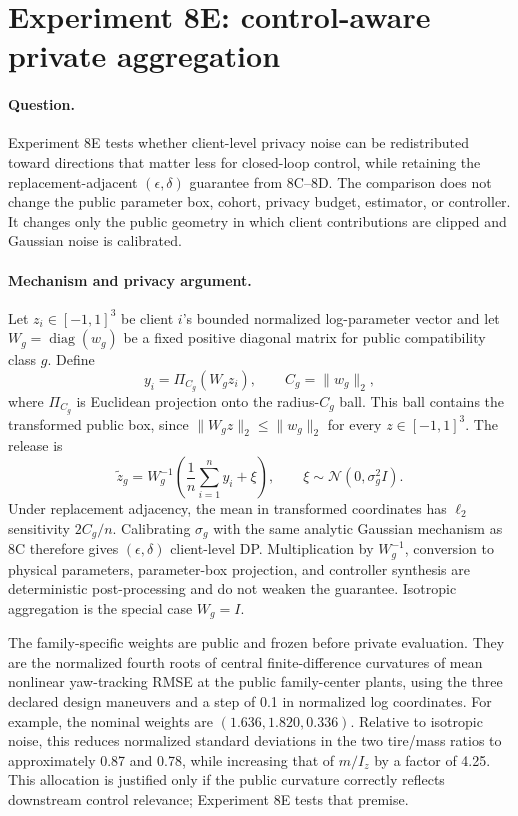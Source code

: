 \section{Experiment 8E: control-aware private aggregation}
\label{sec:experiment8e}

\paragraph{Question.}
Experiment 8E tests whether client-level privacy noise can be redistributed
toward directions that matter less for closed-loop control, while retaining the
replacement-adjacent $(\epsilon,\delta)$ guarantee from 8C--8D. The comparison
does not change the public parameter box, cohort, privacy budget, estimator, or
controller. It changes only the public geometry in which client contributions
are clipped and Gaussian noise is calibrated.

\paragraph{Mechanism and privacy argument.}
Let $z_i\in[-1,1]^3$ be client $i$'s bounded normalized log-parameter vector and
let $W_g=\operatorname{diag}(w_g)$ be a fixed positive diagonal matrix for
public compatibility class $g$. Define
\begin{equation}
 y_i=\Pi_{C_g}(W_gz_i),\qquad C_g=\lVert w_g\rVert_2,
\end{equation}
where $\Pi_{C_g}$ is Euclidean projection onto the radius-$C_g$ ball. This ball
contains the transformed public box, since
$\lVert W_gz\rVert_2\le\lVert w_g\rVert_2$ for every
$z\in[-1,1]^3$. The release is
\begin{equation}
 \widetilde z_g=W_g^{-1}\left(\frac{1}{n}\sum_{i=1}^{n}y_i+
 \xi\right),\qquad \xi\sim\mathcal N(0,\sigma_g^2I).
\end{equation}
Under replacement adjacency, the mean in transformed coordinates has
$\ell_2$ sensitivity $2C_g/n$. Calibrating $\sigma_g$ with the same analytic
Gaussian mechanism as 8C therefore gives $(\epsilon,\delta)$ client-level DP.
Multiplication by $W_g^{-1}$, conversion to physical parameters, parameter-box
projection, and controller synthesis are deterministic post-processing and do
not weaken the guarantee. Isotropic aggregation is the special case $W_g=I$.

The family-specific weights are public and frozen before private evaluation.
They are the normalized fourth roots of central finite-difference curvatures of
mean nonlinear yaw-tracking RMSE at the public family-center plants, using the
three declared design maneuvers and a step of 0.1 in normalized log coordinates.
For example, the nominal weights are $(1.636,1.820,0.336)$. Relative to isotropic
noise, this reduces normalized standard deviations in the two tire/mass ratios
to approximately 0.87 and 0.78, while increasing that of $m/I_z$ by a factor of
4.25. This allocation is justified only if the public curvature correctly
reflects downstream control relevance; Experiment 8E tests that premise.

